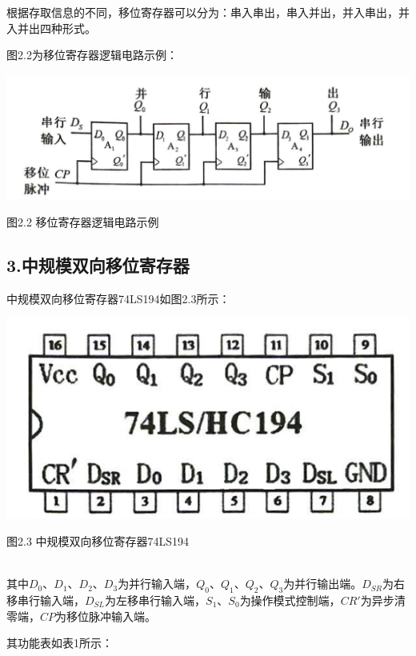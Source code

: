\documentclass{ctexart}
\begin{document}
    根据存取信息的不同，移位寄存器可以分为：串入串出，串入并出，并入串出，并入并出四种形式。

    图2.2为移位寄存器逻辑电路示例：

    \begin{minipage}[c]{0.9\textwidth}
        \centering
        \includegraphics[width=\linewidth]{2.3.png} 

        图2.2 移位寄存器逻辑电路示例
    \end{minipage}

    \subsection*{3.中规模双向移位寄存器}
    中规模双向移位寄存器74LS194如图2.3所示：

    \begin{minipage}[c]{0.9\textwidth}
        \centering
        \includegraphics[width=0.7\linewidth]{2.4.png} 

        图2.3 中规模双向移位寄存器74LS194
    \end{minipage}

~\\
    其中$D_0$、$D_1$、$D_2$、$D_3$为并行输入端，$Q_0$、$Q_1$、$Q_2$、$Q_3$为并行输出端。$D_{SR}$为右移串行输入端，$D_{SL}$为左移串行输入端，$S_1$、$S_0$为操作模式控制端，$CR'$为异步清零端，$CP$为移位脉冲输入端。

    其功能表如表1所示：
\end{document}
